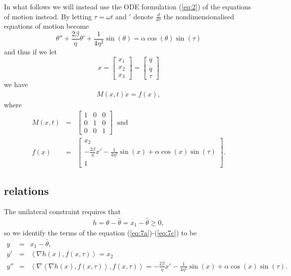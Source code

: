 \documentclass[10pt]{article}
\begin{document}
In what follows we will instead use the ODE formulation (\ref{eq:2}) of the equations of motion instead. By letting $\tau = \omega t$ and $'$ denote $\frac{d}{d\tau}$ the nondimensionalised equations of motion become
\begin{equation}
  \theta'' + \frac{2\beta}{\eta}\theta' + \frac{1}{4\eta^2}\sin(\theta) = \alpha\cos(\theta)\sin(\tau)
\end{equation}
and thus if we let 
\begin{equation}
  x=
  \left[\begin{array}{c}
  x_1 \\
  x_2 \\
  x_3
  \end{array}\right] =
  \left[\begin{array}{c}
  q \\
  \dot{q} \\
  \tau
  \end{array}\right]
\end{equation}
we have
\begin{eqnarray}
  M(x,t)\dot{x}= f(x),
\end{eqnarray}
where
\begin{eqnarray}
  M(x,t)&=& \left[\begin{array}{ccc}
  1&0&0 \\
  0&1&0 \\
  0&0&1
  \end{array}\right] \ \textrm { and} \\
f(x)& = & \left[\begin{array}{c}
  x_2 \\
  -\frac{2\beta}{\eta}x' - \frac{1}{4\eta^2}\sin(x) + \alpha\cos(x)\sin(\tau)\\
  1
  \end{array}\right].
\end{eqnarray}
\subsection{relations}

The unilateral constraint requires that
\begin{eqnarray}
  \label{eq:14}
   h = \theta - \hat{\theta} = x_1 - \hat{\theta}  \geq 0,
\end{eqnarray}
so we identify the terms of the equation (\ref{eq:7a})-(\ref{eq:7c}) to be 
\begin{eqnarray}
  \label{eq:15}
  y&=& x_1 - \hat{\theta},\\
  y'&=& \left\langle \nabla h(x),f(x,\tau)\right\rangle = x_2\\
  y'' &=&  \left\langle\nabla\left\langle\nabla h(x),f(x,\tau)\right\rangle,f(x,\tau)\right\rangle =   -\frac{2\beta}{\eta}x' - \frac{1}{4\eta^2}\sin(x) + \alpha\cos(x)\sin(\tau).
\end{eqnarray}
\end{document}
